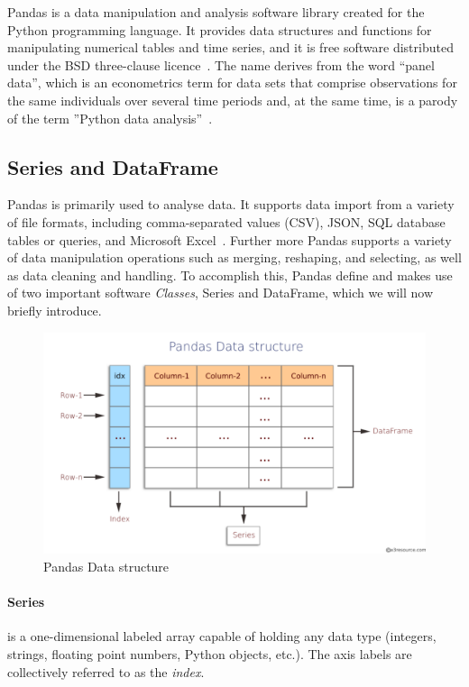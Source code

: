 Pandas is a data manipulation and analysis software library created for the Python programming language. It provides data structures and functions for manipulating numerical tables and time series, and it is free software distributed under the BSD three-clause licence~\cite{Misc:OpenLDAP_license:oldap-2.7}.
The name derives from the word ``panel data'', which is an econometrics term for data sets that comprise observations for the same individuals over several time periods and, at the same time, is a parody of the term ''Python data analysis''~\cite{mckinney_data_2010}.

\subsection{Series and DataFrame}

Pandas is primarily used to analyse data. It supports data import from a variety of file formats, including comma-separated values (CSV), JSON, SQL database tables or queries, and Microsoft Excel~\cite{Misc:pandas_docs}.
Further more Pandas supports a variety of data manipulation operations such as merging, reshaping, and selecting, as well as data cleaning and handling.
To accomplish this, Pandas define and makes use of two important software \textit{Classes}, Series and DataFrame, which we will now briefly introduce.
\begin{figure}[ht]
    \centering
    \includegraphics[width=\textwidth]{content/chapter_3/images/datastructure.pdf}
    \caption{Pandas Data structure}
    \label{fig:pandas_dataframe}
\end{figure}
\paragraph{Series} is a one-dimensional labeled array capable of holding any data type (integers, strings, floating point numbers, Python objects, etc.). The axis labels are collectively referred to as the \textit{index}.

